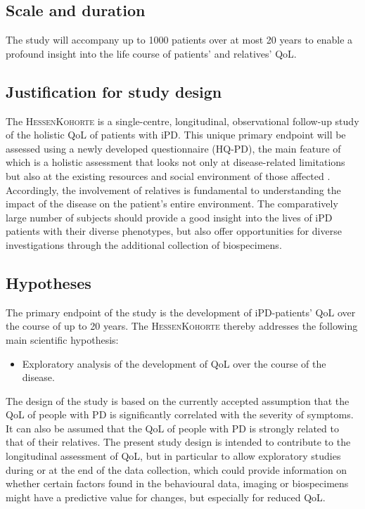 \subsection{Scale and duration}
The study will accompany up to \num[round-precision = 0, round-mode = places]{1000}{} patients over at most 20 years to enable a profound insight into the life course of patients' and relatives' \ac{QoL}.

\subsection{Justification for study design}
The \textsc{HessenKohorte} is a single-centre, longitudinal, observational follow-up study of the holistic \ac{QoL} of patients with \ac{iPD}. This unique primary endpoint will be assessed using a newly developed questionnaire (\ac{HQ-PD}), the main feature of which is a holistic assessment that looks not only at disease-related limitations but also at the existing resources and social environment of those affected \cite{thieken2022jpd}. Accordingly, the involvement of relatives is fundamental to understanding the impact of the disease on the patient's entire environment. The comparatively large number of subjects should provide a good insight into the lives of \ac{iPD} patients with their diverse phenotypes, but also offer opportunities for diverse investigations through the additional collection of biospecimens.

\subsection{Hypotheses}
\label{sec:hypoTheses}
The primary endpoint of the study is the development of \ac{iPD}-patients' \ac{QoL} over the course of up to 20 years. The \textsc{HessenKohorte} thereby addresses the following main scientific hypothesis:
\begin{itemize}
  \item Exploratory analysis of the development of \acl{QoL} over the course of the disease.
\end{itemize}
The design of the study is based on the currently accepted assumption that the \ac{QoL} of people with PD is significantly correlated with the severity of symptoms. It can also be assumed that the \ac{QoL} of people with PD is strongly related to that of their relatives. The present study design is intended to contribute to the longitudinal assessment of \ac{QoL}, but in particular to allow exploratory studies during or at the end of the data collection, which could provide information on whether certain factors found in the behavioural data, imaging or biospecimens might have a predictive value for changes, but especially for reduced QoL.

